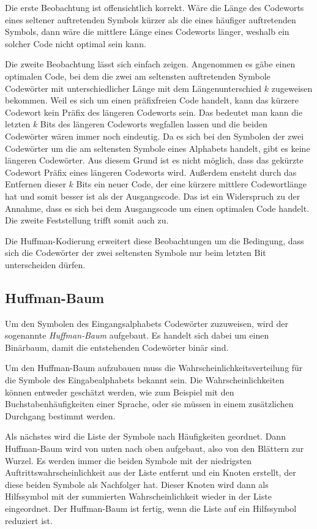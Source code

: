 \documentclass[twoside,11pt,a4paper]{article}
\theoremstyle{break}
\begin{document}
Die erste Beobachtung ist offensichtlich korrekt. Wäre die Länge des
Codeworts eines seltener auftretenden Symbols kürzer als die eines
häufiger auftretenden Symbols, dann wäre die mittlere Länge eines
Codeworts länger, weshalb ein solcher Code nicht optimal sein kann.

Die zweite Beobachtung lässt sich einfach zeigen. Angenommen es gäbe
einen optimalen Code, bei dem die zwei am seltensten auftretenden
Symbole Codewörter mit unterschiedlicher Länge mit dem
Längenunterschied $k$ zugeweisen bekommen. Weil es sich um einen
präfixfreien Code handelt, kann das kürzere Codewort kein Präfix des
längeren Codeworts sein. Das bedeutet man kann die letzten $k$ Bits
des längeren Codeworts wegfallen lassen und die beiden Codewörter
wären immer noch eindeutig. Da es sich bei den Symbolen der zwei
Codewörter um die am seltensten Symbole eines Alphabets handelt, gibt
es keine längeren Codewörter. Aus diesem Grund ist es nicht möglich,
dass das gekürzte Codewort Präfix eines längeren Codeworts
wird. Außerdem ensteht durch das Entfernen dieser $k$ Bits ein neuer
Code, der eine kürzere mittlere Codewortlänge hat und somit besser ist
als der Ausgangscode. Das ist ein Widerspruch zu der Annahme, dass es
sich bei dem Ausgangscode um einen optimalen Code handelt. Die zweite
Feststellung trifft somit auch zu.

Die Huffman-Kodierung erweitert diese Beobachtungen um die Bedingung,
dass sich die Codewörter der zwei seltensten Symbole nur beim letzten
Bit unterscheiden dürfen.

\subsection{Huffman-Baum}
Um den Symbolen des Eingangsalphabets Codewörter zuzuweisen, wird der
sogenannte \emph{Huffman-Baum} aufgebaut. Es handelt sich dabei um
einen Binärbaum, damit die entstehenden Codewörter binär sind.

Um den Huffman-Baum aufzubauen muss die Wahrscheinlichkeitsverteilung
für die Symbole des Eingabealphabets bekannt sein. Die
Wahrscheinlichkeiten können entweder geschätzt werden, wie zum
Beispiel mit den Buchstabenhäufigkeiten einer Sprache, oder sie müssen
in einem zusätzlichen Durchgang bestimmt werden.

Als nächstes wird die Liste der Symbole nach Häufigkeiten geordnet.
Dann Huffman-Baum wird von unten nach oben aufgebaut, also von den
Blättern zur Wurzel. Es werden immer die beiden Symbole mit der
niedrigsten Auftrittswahrscheinlichkeit aus der Liste entfernt und ein
Knoten erstellt, der diese beiden Symbole als Nachfolger hat. Dieser
Knoten wird dann als Hilfssymbol mit der summierten Wahrscheinlichkeit
wieder in der Liste eingeordnet. Der Huffman-Baum ist fertig, wenn die
Liste auf ein Hilfssymbol reduziert ist.
\end{document}
